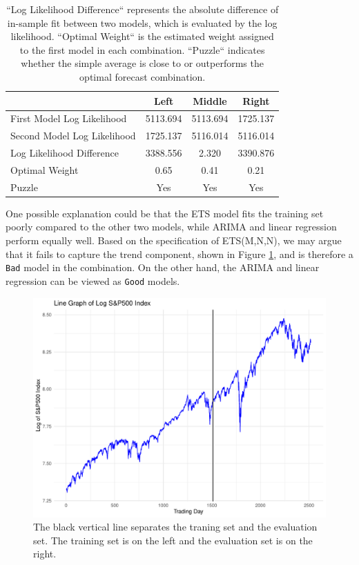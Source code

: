 \documentclass{monashthesis}
\begin{document}
\begin{table}[ht]
  \centering
    \begin{tabular}{l|ccc}
    \toprule
                                      &        Left        &     Middle     &    Right       \\  
    \midrule
    First Model Log Likelihood        &     5113.694       &    5113.694    &   1725.137     \\
    Second Model Log Likelihood       &     1725.137       &    5116.014    &   5116.014     \\
    Log Likelihood Difference         &     3388.556       &     2.320      &   3390.876     \\
    Optimal Weight                    &       0.65         &      0.41      &     0.21       \\
    Puzzle                            &       Yes          &      Yes       &     Yes        \\
    \bottomrule
    \end{tabular}
  \caption{``Log Likelihood Difference`` represents the absolute difference of in-sample fit between two models, which is evaluated by the log likelihood. ``Optimal Weight`` is the estimated weight assigned to the first model in each combination. ``Puzzle`` indicates whether the simple average is close to or outperforms the optimal forecast combination.}
  \label{tab:nonfit}
\end{table}

One possible explanation could be that the ETS model fits the training set poorly compared to the other two models, while ARIMA and linear regression perform equally well. Based on the specification of ETS(M,N,N), we may argue that it fails to capture the trend component, shown in Figure \ref{fig:llg}, and is therefore a \texttt{Bad} model in the combination. On the other hand, the ARIMA and linear regression can be viewed as \texttt{Good} models.

\begin{figure}[ht]
\centering
\includegraphics[scale=0.4]{figures/log_linegraph.pdf}
\caption{The black vertical line separates the traning set and the evaluation set. The training set is on the left and the evaluation set is on the right.}
\label{fig:llg}
\end{figure}
\end{document}
